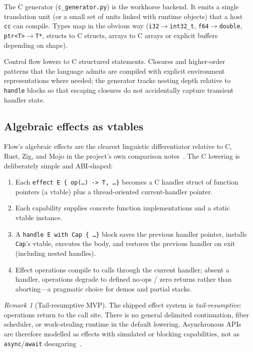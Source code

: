 \documentclass[11pt,a4paper]{article}
\theoremstyle{remark}
\newtheorem{remark}{Remark}
\begin{document}
The C generator (\texttt{c\_generator.py}) is the workhorse backend. It emits a
single translation unit (or a small set of units linked with runtime objects)
that a host \texttt{cc} can compile. Types map in the obvious way
(\texttt{i32}$\to$\texttt{int32\_t}, \texttt{f64}$\to$\texttt{double},
\texttt{ptr<T>}$\to$\texttt{T*}, structs to C structs, arrays to C arrays or
explicit buffers depending on shape).

Control flow lowers to C structured statements. Closures and higher-order
patterns that the language admits are compiled with explicit environment
representations where needed; the generator tracks nesting depth relative to
\texttt{handle} blocks so that escaping closures do not accidentally capture
transient handler state.

\subsection{Algebraic effects as vtables}
\label{sec:effects}

Flow's algebraic effects are the clearest linguistic differentiator relative to
C, Rust, Zig, and Mojo in the project's own comparison notes~\cite{flow-cmp}.
The C lowering is deliberately simple and ABI-shaped:

\begin{enumerate}[leftmargin=*]
  \item Each \texttt{effect E \{ op(\ldots) -> T, \ldots \}} becomes a C
        handler struct of function pointers (a vtable) plus a
        thread-oriented current-handler pointer.
  \item Each capability supplies concrete function implementations and a
        static vtable instance.
  \item A \texttt{handle E with Cap \{ \ldots \}} block saves the previous
        handler pointer, installs \texttt{Cap}'s vtable, executes the body,
        and restores the previous handler on exit (including nested handles).
  \item Effect operations compile to calls through the current handler; absent
        a handler, operations degrade to defined no-ops / zero returns rather
        than aborting---a pragmatic choice for demos and partial stacks.
\end{enumerate}

\begin{remark}[Tail-resumptive MVP]
The shipped effect system is \emph{tail-resumptive}: operations return to the
call site. There is no general delimited continuation, fiber scheduler, or
work-stealing runtime in the default lowering. Asynchronous APIs are therefore
modelled as effects with simulated or blocking capabilities, not as
\texttt{async}/\texttt{await} desugaring~\cite{flow-async}.
\end{remark}
\end{document}
